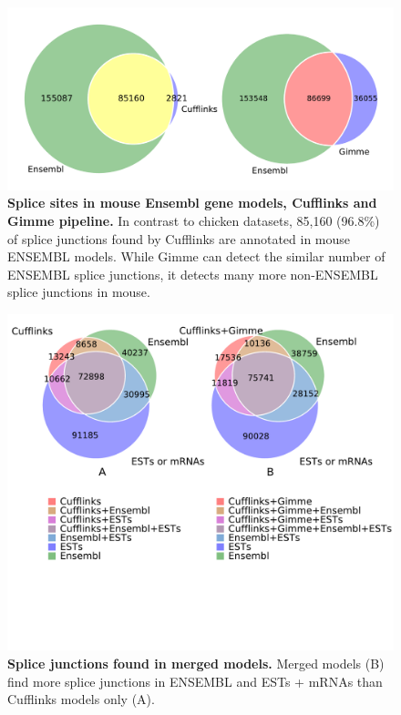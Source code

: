 \documentclass[10pt]{article}
\begin{document}
\begin{figure}[!ht]
\begin{center}
\includegraphics[width=5in]{mouse_venn.pdf}
\end{center}
\caption{
{\bf Splice sites in mouse Ensembl gene models, Cufflinks and
Gimme pipeline.}
In contrast to chicken datasets, 85,160 (96.8\%) of splice
junctions found by Cufflinks are annotated in mouse ENSEMBL
models. While Gimme can detect the similar number of ENSEMBL
splice junctions, it detects many more non-ENSEMBL splice
junctions in mouse.}
\label{mus_venn}
\end{figure}


\begin{figure}[!ht]
\begin{center}
\includegraphics[width=5in]{cuff_gimme_junctions_venn.pdf}
\end{center}
\caption{
{\bf Splice junctions found in merged models.} Merged models (B)
find more splice junctions in ENSEMBL and ESTs + mRNAs than
Cufflinks models only (A).}
\label{combined_venn}
\end{figure}
\end{document}
